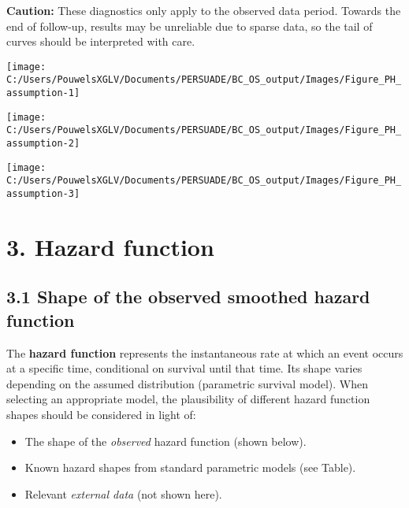 \documentclass[
]{article}
\providecommand{\tightlist}{%
  \setlength{\itemsep}{0pt}\setlength{\parskip}{0pt}}
\begin{document}
\textbf{Caution:} These diagnostics only apply to the observed data
period. Towards the end of follow-up, results may be unreliable due to
sparse data, so the tail of curves should be interpreted with care.

\clearpage

\begin{flushleft}\texttt{[image: C:/Users/PouwelsXGLV/Documents/PERSUADE/BC\_OS\_output/Images/Figure\_PH\_assumption-1]} \end{flushleft}

\begin{flushleft}\texttt{[image: C:/Users/PouwelsXGLV/Documents/PERSUADE/BC\_OS\_output/Images/Figure\_PH\_assumption-2]} \end{flushleft}

\begin{flushleft}\texttt{[image: C:/Users/PouwelsXGLV/Documents/PERSUADE/BC\_OS\_output/Images/Figure\_PH\_assumption-3]} \end{flushleft}

\clearpage

\section{3. Hazard function}\label{hazard-function}

\subsection{3.1 Shape of the observed smoothed hazard
function}\label{shape-of-the-observed-smoothed-hazard-function}

The \textbf{hazard function} represents the instantaneous rate at which
an event occurs at a specific time, conditional on survival until that
time. Its shape varies depending on the assumed distribution (parametric
survival model). When selecting an appropriate model, the plausibility
of different hazard function shapes should be considered in light of:

\begin{itemize}
\tightlist
\item
  The shape of the \emph{observed} hazard function (shown below).
\item
  Known hazard shapes from standard parametric models (see Table).
\item
  Relevant \emph{external data} (not shown here).
\end{itemize}
\end{document}
